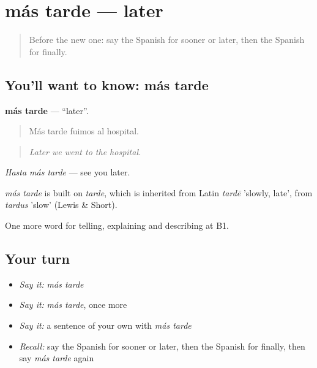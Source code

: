 \section[más tarde]{más tarde — later}

\label{lesson:ES-C535-mas-tarde}



\begin{quote}
Before the new one: say the Spanish for sooner or later, then the Spanish for finally.
\end{quote}

\subsection*{You'll want to know: más tarde}
\textbf{más tarde} — \textquotedblleft{}later\textquotedblright{}.

\begin{quote}
Más tarde fuimos al hospital.
\end{quote}

\begin{quote}
\emph{Later we went to the hospital.}
\end{quote}

\emph{Hasta más tarde} — see you later.

\begin{cousinweb}
\emph{más tarde} is built on \emph{tarde}, which is inherited from Latin \emph{tardē} 'slowly, late', from \emph{tardus} 'slow' (Lewis \& Short).
\end{cousinweb}

\begin{grammarlens}[title={What you've built}]
One more word for telling, explaining and describing at B1.
\end{grammarlens}

\subsection*{Your turn}
\begin{itemize}
\raggedright
  \item \emph{Say it:} \emph{más tarde}
  \item \emph{Say it:} \emph{más tarde}, once more
  \item \emph{Say it:} a sentence of your own with \emph{más tarde}
  \item \emph{Recall:} say the Spanish for sooner or later, then the Spanish for finally, then say \emph{más tarde} again
\end{itemize}

